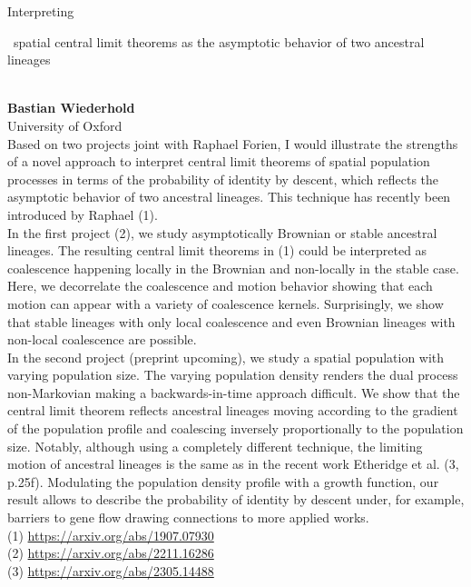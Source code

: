 \documentclass[12pt,a4paper]{article}
\newcommand{\ZAbst}{\rule[-1ex]{0pt}{2ex}\ } %
\begin{document}
\noindent
{\Large Interpreting\ZAbst spatial central limit theorems as the asymptotic behavior of two ancestral lineages}\\[1ex]
{\large 
\textbf{Bastian Wiederhold}\\[1ex] University of Oxford}\\[2ex]
Based on two projects joint with Raphael Forien, I would illustrate the strengths of a novel approach to interpret central limit theorems of spatial population processes in terms of the probability of identity by descent, which reflects the asymptotic behavior of two ancestral lineages. This technique has recently been introduced by Raphael (1). 
\\
In the first project (2), we study asymptotically Brownian or stable ancestral lineages. The resulting central limit theorems in (1) could be interpreted as coalescence happening locally in the Brownian and non-locally in the stable case. Here, we decorrelate the coalescence and motion behavior showing that each motion can appear with a variety of coalescence kernels. Surprisingly, we show that stable lineages with only local coalescence and even Brownian lineages with non-local coalescence are possible.
\\
In the second project (preprint upcoming), we study a spatial population with varying population size. The varying population density renders the dual process non-Markovian making a backwards-in-time approach difficult. We show that the central limit theorem reflects ancestral lineages moving according to the gradient of the population profile and coalescing inversely proportionally to the population size. Notably, although using a completely different technique, the limiting motion of ancestral lineages is the same as in the recent work Etheridge et al. (3, p.25f). Modulating the population density profile with a growth function, our result allows to describe the probability of identity by descent under, for example, barriers to gene flow drawing connections to more applied works.
\\
\noindent
(1)	\url{https://arxiv.org/abs/1907.07930} \\
(2)	\url{https://arxiv.org/abs/2211.16286} \\
(3)	\url{https://arxiv.org/abs/2305.14488}


\bigskip \bigskip  %
\end{document}
